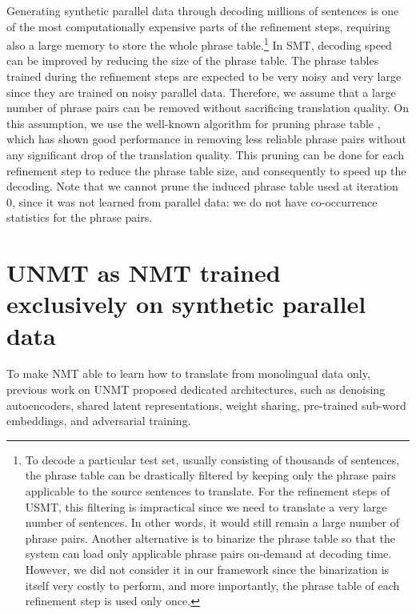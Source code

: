 \documentclass[11pt,a4paper]{article}
\begin{document}
Generating synthetic parallel data through decoding millions of sentences is one of the most computationally expensive parts of the refinement steps, requiring also a large memory to store the whole phrase table.\footnote{To decode a particular test set, usually consisting of thousands of sentences, the phrase table can be drastically filtered by keeping only the phrase pairs applicable to the source sentences to translate. For the refinement steps of USMT, this filtering is impractical since we need to translate a very large number of sentences. In other words, it would still remain a large number of phrase pairs. Another alternative is to binarize the phrase table so that the system can load only applicable phrase pairs on-demand at decoding time. However, we did not consider it in our framework since the binarization is itself very costly to perform, and more importantly, the phrase table of each refinement step is used only once.} In SMT, decoding speed can be improved by reducing the size of the phrase table.
The phrase tables trained during the refinement steps are expected to be very noisy and very large since they are trained on noisy parallel data. Therefore, we assume that a large number of phrase pairs can be removed without sacrificing translation quality. On this assumption, we use the well-known algorithm for pruning phrase table \citep{johnson-EtAl:2007:EMNLP-CoNLL2007}, which has shown good performance in removing less reliable phrase pairs without any significant drop of the translation quality. This pruning can be done for each refinement step to reduce the phrase table size, and consequently to speed up the decoding.
Note that we cannot prune the induced phrase table used at iteration 0, since it was not learned from parallel data: we do not have co-occurrence statistics for the phrase pairs.








\section{UNMT as NMT trained exclusively on synthetic parallel data}


To make NMT able to learn how to translate from monolingual data only, previous work on UNMT \citep{artetxe2018unsupervisednmt,lample2018unsupervisednmt,DBLP:journals/corr/abs-1804-07755,P18-1005} proposed dedicated architectures, such as denoising autoencoders, shared latent representations, weight sharing, pre-trained sub-word embeddings, and adversarial training.
\end{document}
